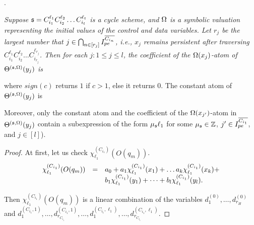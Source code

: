 \begin{appendix}
.
{\it Suppose ${\mathfrak{s} }=C_{i_1}^{\ell_1} C_{i_2}^{\ell_2} \dots C_{i_t}^{\ell_t}$ is a cycle scheme, and $\Omega$ is a symbolic valuation representing the initial values of the control and data variables. Let $r_j$ be the largest number that $j\in\bigcap_{n\in[r_j]} I^{\overline{C_{i_{n}}}}_{pe}$, i.e., $x_j$ remains persistent after traversing $C_{i_1}^{\ell_1} C_{i_2}^{\ell_2} \dots C_{i_{r_j}}^{\ell_{r_j}}$.
Then for each $j: 1 \le j \le l$, the coefficient of the $\Omega(x_{j})$-atom of $\Theta^{({\mathfrak{s} },\Omega)}(y_j)$ is
\begin{center}
\end{center}
 where $sign(c)$ returns $1$ if $c>1$, else it returns $0$. The constant atom of $\Theta^{({\mathfrak{s} },\Omega)}(y_j)$ is 
\begin{center}
\end{center}
Moreover, only the constant atom and the coefficient of the $\Omega(x_{j'})$-atom in $\Theta^{({\mathfrak{s} },\Omega)}(y_j)$ contain a subexpression of the form $ \mu_{\mathfrak{s} } \ell_1$ for some $\mu_{\mathfrak{s} }\in {\mathbb{Z} }$, $j' \in  I^{\overline{C_{i_{1}}}}_{pe}$, and $j \in [l]$).
}

\begin{proof}
At first,  let us check $\chi^{(C_{i_1})}_{\ell_1}(O(q_m))$.
\[
\begin{array}{l c l}
\chi^{(C_{i_1})}_{\ell_1}(O(q_m)) & = & a_0 + a_1 \chi^{(C_{i_1})}_{\ell_1}(x_1) + \dots a_k \chi^{(C_{i_1})}_{\ell_1}(x_k) + \\
& & b_1 \chi^{(C_{i_1})}_{\ell_1}(y_1) + \dots + b_l \chi^{(C_{i_1})}_{\ell_1}(y_l).
\end{array}
\] 

Then $\chi^{(C_{i_1})}_{\ell_1}(O(q_m))$ is a linear combination of the variables $d^{(0)}_1,\dots, d^{(0)}_{r_H}$ and $d^{(C_{i_1},1)}_1,\dots, d^{(C_{i_1},1)}_{r_{C_{i_1}}}, \dots, d^{(C_{i_1},\ell_1)}_1,\dots, d^{(C_{i_1},\ell_1)}_{r_{C_{i_1}}}$.


\end{proof}
\end{appendix}
